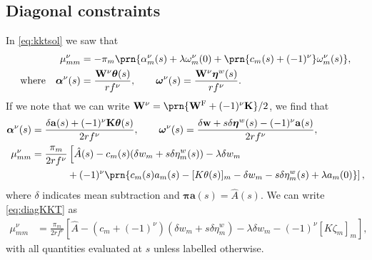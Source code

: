 \documentclass[12pt]{article}
\newcommand{\eqm}{\pi}
\newcommand{\eq}{\boldsymbol{\eqm}}
\newcommand{\etwm}{\eta^w}
\newcommand{\etw}{\boldsymbol{\eta}^w}
\newcommand{\thbm}{\theta}
\newcommand{\thb}{\boldsymbol{\thbm}}
\newcommand{\ombm}{\omega}
\newcommand{\omb}{\boldsymbol{\ombm}}
\newcommand{\albm}{\alpha}
\newcommand{\alb}{\boldsymbol{\albm}}
\newcommand{\dgnm}{\zeta}
\newcommand{\wm}{w}
\newcommand{\w}{\mathbf{\wm}}
\newcommand{\Wm}{W}
\newcommand{\W}{\mathbf{\Wm}}
\newcommand{\encm}{K}
\newcommand{\enc}{\mathbf{\encm}}
\newcommand{\frg}{\W^{\mathrm{F}}}
\newcommand{\kktm}{\mu}
\begin{document}

\subsection{Diagonal constraints}\label{sec:diagKKT}

In \cref{eq:kktsol} we saw that
%
\begin{equation*}
\begin{aligned}
  \kktm^\nu_{mm} &= - \eqm_m \prn{ \albm^\nu_m(s) 
    + \lambda \ombm^\nu_m(0) 
    + \prn{{c}_m(s) + (-1)^\nu} \ombm^\nu_m(s)
    }, \\
  \text{where} \quad 
  \alb^\nu(s) &= \frac{\W^\nu \thb(s)}{rf^\nu}, \qquad
  \omb^\nu(s) = \frac{\W^\nu \etw(s)}{rf^\nu}.
\end{aligned}
\end{equation*}
%
If we note that we can write \( \W^\nu = \prn{\frg + (-1)^\nu \enc} / 2 \), we find that
%
\begin{equation}\label{eq:diagKKT}
\begin{aligned}
  \alb^\nu(s) &= \frac{\delta\mathbf{a}(s) + (-1)^\nu \enc \thb(s)}
                     {2rf^\nu},
  \qquad 
  \omb^\nu(s) = \frac{\delta\w + s \delta\etw(s) - (-1)^\nu \mathbf{a}(s)}
                     {2rf^\nu}, 
  \\
  \kktm^\nu_{mm} &= \frac{\eqm_m}{2rf^\nu} 
    \left[ 
      \hat{A}(s) - c_m(s) (\delta\wm_m + s \delta\etwm_m(s))
      - \lambda \delta w_m
    \right. \\ &\hphantom{= \frac{\eqm_m}{2f^\nu} \big[}
    \left. {}
      + (-1)^\nu \prn{ 
        c_m(s) a_m(s) - [\encm \thbm(s)]_m
        - \delta\wm_m - s \delta\etwm_m(s)
        + \lambda a_m(0)
      }
    \right], 
\end{aligned}
\end{equation}
%
where \(\delta\) indicates mean subtraction and \(\eq \mathbf{a}(s) = \hat{A}(s)\).
We can write \cref{eq:diagKKT} as
%
\begin{equation*}
\begin{aligned}
  \kktm^\nu_{mm} &= \frac{\eqm_m}{2rf^\nu} 
    \left[ 
      \hat{A}
      - (c_m + (-1)^\nu) (\delta \wm_m + s \delta \etwm_m)
      - \lambda \delta w_m
      - (-1)^\nu [\encm \dgnm_m]_m
    \right],
\end{aligned}
\end{equation*}
%
with all quantities evaluated at \(s\) unless labelled otherwise.
\end{document}
